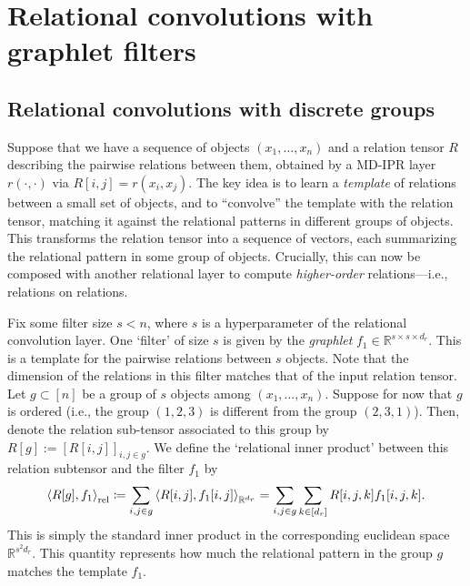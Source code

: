 \section{Relational convolutions with graphlet filters}\label{sec:relconv}

\subsection{Relational convolutions with discrete groups}\label{ssec:relconv_discrete_groups}
Suppose that we have a sequence of objects $(x_1, \ldots, x_n)$ and a relation tensor $R$ describing the pairwise relations between them, obtained by a MD-IPR layer $r(\cdot, \cdot)$ via $R[i,j] = r(x_i, x_j)$. The key idea is to learn a \textit{template} of relations between a small set of objects, and to ``convolve'' the template with the relation tensor, matching it against the relational patterns in different groups of objects. This transforms the relation tensor into a sequence of vectors, each summarizing the relational pattern in some group of objects. Crucially, this can now be composed with another relational layer to compute \textit{higher-order} relations---i.e., relations on relations.

Fix some filter size $s < n$, where $s$ is a hyperparameter of the relational convolution layer. One `filter' of size $s$ is given by the \textit{graphlet} $f_1 \in \mathbb{R}^{s \times s \times d_r}$. This is a template for the pairwise relations between $s$ objects. Note that the dimension of the relations in this filter matches that of the input relation tensor. Let $g \subset [n]$ be a group of $s$ objects among $(x_1, \ldots, x_n)$. Suppose for now that $g$ is ordered (i.e., the group $(1, 2, 3)$ is different from the group $(2, 3, 1)$). Then, denote the relation sub-tensor associated to this group by $R[g] := [R[i,j]]_{i,j \in g}$. We define the `relational inner product' between this relation subtensor and the filter $f_1$ by
\begin{equation}
    \label{eq:relational_inner_prod_one_filt}
    \left\langle R[g], f_1 \right\rangle_\mathrm{rel} \coloneqq \sum_{i,j \in g} \left \langle R[i,j], f_1[i,j] \right\rangle_{\mathbb{R}^{d_r}} = \sum_{i,j \in g} \sum_{k \in [d_r]} R[i,j,k] f_1[i,j,k].
\end{equation}
This is simply the standard inner product in the corresponding euclidean space $\mathbb{R}^{s^2 d_r}$. This quantity represents how much the relational pattern in the group $g$ matches the template $f_1$.



